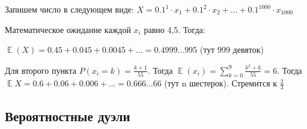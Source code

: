 \documentclass[12pt]{article}
\DeclareMathOperator{\E}{\mathbb{E}}
\newenvironment{solution}{}{}
\begin{document}
\begin{enumerate}
\begin{solution}
    Запишем число в следующем виде: $X = 0.1^1 \cdot x_1 + 0.1^2 \cdot x_2 + \dots + 0.1^{1000} \cdot x_{1000}$
    
    Математическое ожидание каждой $x_i$ равно 4,5. Тогда:
    
    $\E(X) = 0.45 + 0.045 + 0.0045 + \dots = 0.4999\dots995$ (тут 999 девяток)
    
    Для второго пункта $P(x_i = k) = \frac{k + 1}{55}$. Тогда $\E(x_i) = \sum_{k = 0}^{9} \frac{k^2 + k}{55} = 6$. Тогда $\E{X} = 0.6 + 0.06 + 0.006 + \dots = 0.666\dots66$ (тут n шестерок). Стремится к $\frac{2}{3}$
\end{solution}
    

\end{enumerate}



\newpage
\subsection*{Вероятностные дуэли}
\end{document}
